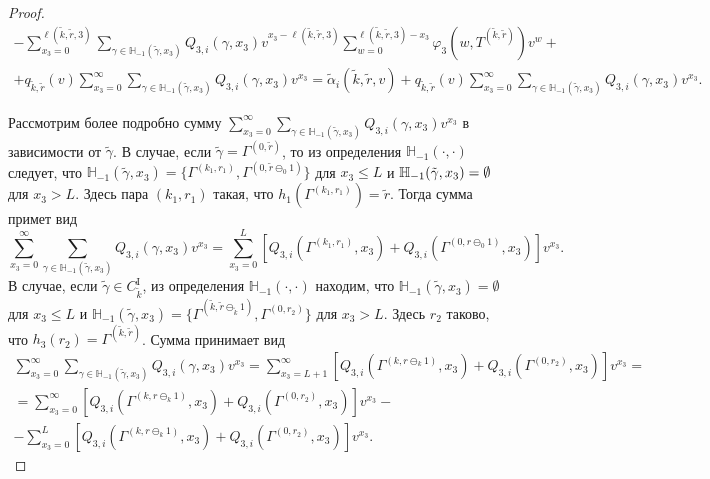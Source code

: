 \documentclass[a4paper,12pt,russian]{extarticle}
\begin{document}
\begin{proof}
\begin{multline}
-\sum_{x_3=0}^{\ell(\tilde{k},\tilde{r},3)}  \sum_{\gamma \in {\mathbb H}_{-1}(\tilde{\gamma},x_3)} Q_{3,i}(\gamma,x_3) v^{x_3-\ell(\tilde{k},\tilde{r},3)}   \sum_{w=0}^{\ell(\tilde{k},\tilde{r},3) -x_3}
\varphi_3(w,T^{(\tilde{k},\tilde{r})}) v^w   +\\
+ q_{\tilde{k},\tilde{r}}(v) \sum_{x_3=0}^{\infty} \sum_{\gamma \in {\mathbb H}_{-1}(\tilde{\gamma},x_3)} Q_{3,i}(\gamma,x_3) v^{x_3} = \tilde{\alpha}_i(\tilde{k},\tilde{r},v) + q_{\tilde{k},\tilde{r}}(v) \sum_{x_3=0}^{\infty} \sum_{\gamma \in {\mathbb H}_{-1}(\tilde{\gamma},x_3)} Q_{3,i}(\gamma,x_3) v^{x_3}.
\label{rekur:general:second}
\end{multline}

Рассмотрим более подробно сумму $\sum_{x_3=0}^{\infty} \sum_{\gamma \in {\mathbb H}_{-1}(\tilde{\gamma},x_3)} Q_{3,i}(\gamma,x_3) v^{x_3}$ в зависимости от $\tilde{\gamma}$.
В случае, если $\tilde{\gamma} = \Gamma^{(0,\tilde{r})}$, то из определения ${\mathbb H}_{-1}(\cdot,\cdot)$ следует, что ${\mathbb H}_{-1}(\tilde{\gamma},x_3) = \{\Gamma^{(k_1,r_1)}, \Gamma^{(0,\tilde{r}\ominus_0 1)}\}$ для $x_3 \leqslant L$ и
${\mathbb H}_{-1}(\tilde{\gamma},x_3) \hm=\emptyset$ для $x_3 > L$. Здесь пара $(k_1,r_1)$ такая, что $h_1(\Gamma^{(k_1,r_1)}) = \tilde{r}$. Тогда сумма примет вид
\begin{equation}
\sum_{x_3=0}^{\infty} \sum_{\gamma \in {\mathbb H}_{-1}(\tilde{\gamma},x_3)} Q_{3,i}(\gamma,x_3) v^{x_3} = \sum_{x_3=0}^{L} \left[ Q_{3,i}(\Gamma^{(k_1,r_1)},x_3) + Q_{3,i}(\Gamma^{(0,r\ominus_0 1)},x_3) \right] v^{x_3}.
\label{rekur:additional:first}
\end{equation}
В случае, если $\tilde{\gamma} \in C_{\tilde{k}}^{\mathrm{I}}$, из определения  ${\mathbb H}_{-1}(\cdot,\cdot)$ находим, что ${\mathbb H}_{-1}(\tilde{\gamma},x_3) = \emptyset$ для $x_3 \leqslant L$ и ${\mathbb H}_{-1}(\tilde{\gamma},x_3) = \{\Gamma^{(\tilde{k},\tilde{r}\ominus_{\tilde{k}} 1)}, \Gamma^{(0,r_2)}\}$ для $x_3 > L$. Здесь $r_2$ таково, что $h_3(r_2)=\Gamma^{(\tilde{k},\tilde{r})}$. Сумма принимает вид
\begin{multline}
\sum_{x_3=0}^{\infty} \sum_{\gamma \in {\mathbb H}_{-1}(\tilde{\gamma},x_3)} Q_{3,i}(\gamma,x_3) v^{x_3} = \sum_{x_3=L+1}^{\infty} \left[ Q_{3,i}(\Gamma^{(k,r\ominus_k 1)},x_3) + Q_{3,i}(\Gamma^{(0,r_2)},x_3) \right] v^{x_3} = \\=
\sum_{x_3=0}^{\infty} \left[ Q_{3,i}(\Gamma^{(k,r\ominus_k 1)},x_3) + Q_{3,i}(\Gamma^{(0,r_2)},x_3) \right] v^{x_3} -\\
-\sum_{x_3=0}^{L} \left[ Q_{3,i}(\Gamma^{(k,r\ominus_k 1)},x_3) + Q_{3,i}(\Gamma^{(0,r_2)},x_3) \right] v^{x_3}.

\end{multline}
\end{proof}
\end{document}
